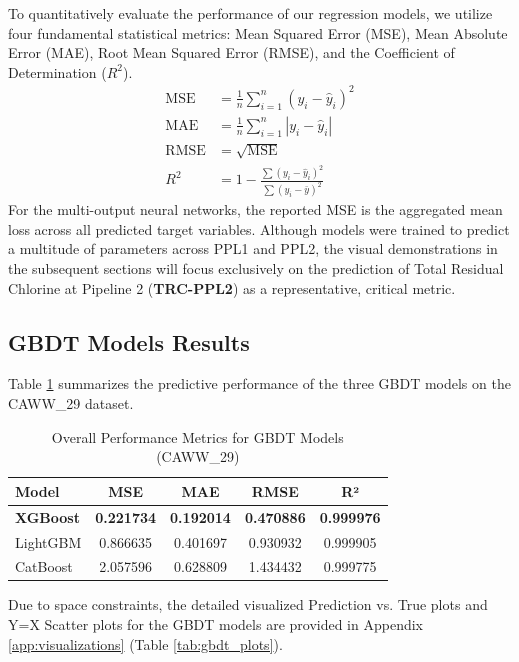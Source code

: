 \documentclass[a4paper]{article}
\begin{document}
To quantitatively evaluate the performance of our regression models, we utilize four fundamental statistical metrics: Mean Squared Error (MSE), Mean Absolute Error (MAE), Root Mean Squared Error (RMSE), and the Coefficient of Determination ($R^2$). 
\begin{align*}
    \text{MSE} &= \frac{1}{n} \sum_{i=1}^{n} (y_i - \hat{y}_i)^2 \\
    \text{MAE} &= \frac{1}{n} \sum_{i=1}^{n} |y_i - \hat{y}_i| \\
    \text{RMSE} &= \sqrt{\text{MSE}} \\
    R^2 &= 1 - \frac{\sum (y_i - \hat{y}_i)^2}{\sum (y_i - \bar{y})^2}
\end{align*}
For the multi-output neural networks, the reported MSE is the aggregated mean loss across all predicted target variables. Although models were trained to predict a multitude of parameters across PPL1 and PPL2, the visual demonstrations in the subsequent sections will focus exclusively on the prediction of Total Residual Chlorine at Pipeline 2 (\textbf{TRC-PPL2}) as a representative, critical metric.

\subsection{GBDT Models Results}

Table \ref{tab:gbdt_metrics} summarizes the predictive performance of the three GBDT models on the CAWW\_29 dataset.

\begin{table}[h!]
\centering
\caption{Overall Performance Metrics for GBDT Models (CAWW\_29)}
\label{tab:gbdt_metrics}
\begin{tabular}{lcccc}
\toprule
\textbf{Model} & \textbf{MSE} & \textbf{MAE} & \textbf{RMSE} & \textbf{R²} \\
\midrule
\textbf{XGBoost} & \textbf{0.221734} & \textbf{0.192014} & \textbf{0.470886} & \textbf{0.999976} \\
LightGBM & 0.866635 & 0.401697 & 0.930932 & 0.999905 \\
CatBoost & 2.057596 & 0.628809 & 1.434432 & 0.999775 \\
\bottomrule
\end{tabular}
\end{table}

Due to space constraints, the detailed visualized Prediction vs. True plots and Y=X Scatter plots for the GBDT models are provided in Appendix \ref{app:visualizations} (Table \ref{tab:gbdt_plots}).
\end{document}
